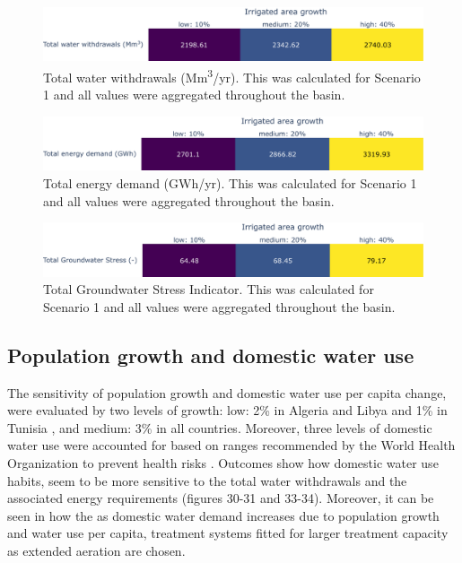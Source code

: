 \documentclass[12pt]{iopart}
\begin{document}
\begin{figure}[!h]
	\centering
	\includegraphics[width=\textwidth]{AreaSensitivityWaterAll}
	\caption{Total water withdrawals (Mm\textsuperscript{3}/yr). This was calculated for Scenario 1 and all values were aggregated throughout the basin.}
	\label{fig:areasenswaterall}
\end{figure} 

\begin{figure}[!h]
	\centering
	\includegraphics[width=\textwidth]{AreaSensitivityEnergyAll}
	\caption{Total energy demand (GWh/yr). This was calculated for Scenario 1 and all values were aggregated throughout the basin.}
	\label{fig:areasensenergyall}
\end{figure}

\begin{figure}[!h]
	\centering
	\includegraphics[width=\textwidth]{AreaSensitivityGWSAll}
	\caption{Total Groundwater Stress Indicator. This was calculated for Scenario 1 and all values were aggregated throughout the basin.}
	\label{fig:areasensgwsall}
\end{figure}

\newpage
\subsection{Population growth and domestic water use}
The sensitivity of population growth and domestic water use per capita change, were evaluated by two levels of growth: low: 2\% in Algeria and Libya and 1\% in Tunisia \cite{uneceReconcilingResourceUses2020}, and medium: 3\% in all countries. Moreover, three levels of domestic water use were accounted for based on ranges recommended by the World Health Organization to prevent health risks \cite{Householdwaterconsumption2014}. Outcomes show how domestic water use habits, seem to be more sensitive to the total water withdrawals and the associated energy requirements (figures 30-31 and 33-34). Moreover, it can be seen in  how the as domestic water demand increases due to population growth and water use per capita, treatment systems fitted for larger treatment capacity as extended aeration are chosen.
\end{document}
